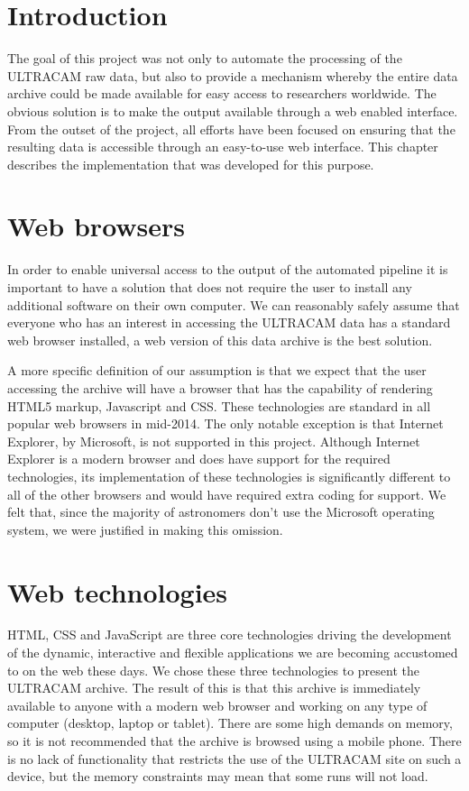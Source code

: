 \section{Introduction} 
The goal of this project was not only to automate the processing of the ULTRACAM raw data, but also to provide a mechanism whereby the entire data archive could be made available for easy access to researchers worldwide. The obvious solution is to make the output available through a web enabled interface. From the outset of the project, all efforts have been focused on ensuring that the resulting data is accessible through an easy-to-use web interface. This chapter describes the implementation that was developed for this purpose. 

\section{Web browsers}
In order to enable universal access to the output of the automated pipeline it is important to have a solution that does not require the user to install any additional software on their own computer. We can reasonably safely assume that everyone who has an interest in accessing the ULTRACAM data has a standard web browser installed, a web version of this data archive is the best solution. 

A more specific definition of our assumption is that we expect that the user accessing the archive will have a browser that has the capability of rendering HTML5 markup, Javascript and CSS. These technologies are standard in all popular web browsers in mid-2014. The only notable exception is that Internet Explorer, by Microsoft, is not supported in this project. Although Internet Explorer is a modern browser and does have support for the required technologies, its implementation of these technologies is significantly different to all of the other browsers and would have required extra coding for support. We felt that, since the majority of astronomers don't use the Microsoft operating system, we were justified in making this omission.  

\section{Web technologies}
HTML, CSS and JavaScript are three core technologies driving the development of the dynamic, interactive and flexible applications we are becoming accustomed to on the web these days. We chose these three technologies to present the ULTRACAM archive. The result of this is that this archive is immediately available to anyone with a modern web browser and working on any type of computer (desktop, laptop or tablet). There are some high demands on memory, so it is not recommended that the archive is browsed using a mobile phone. There is no lack of functionality that restricts the use of the ULTRACAM site on such a device, but the memory constraints may mean that some runs will not load.  

